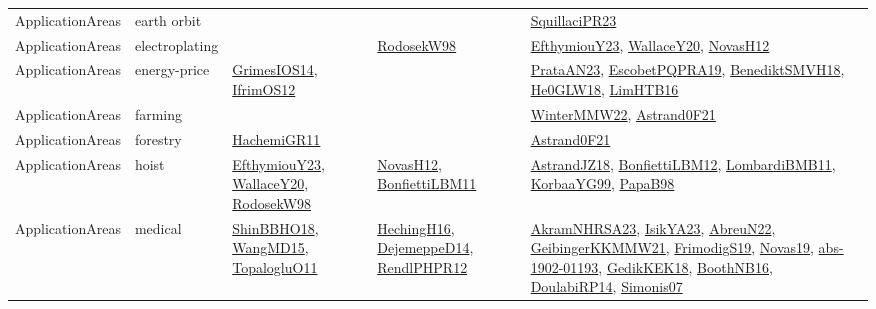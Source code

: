 {\begin{longtable}{lp{3cm}>{\raggedright}p{6cm}>{\raggedright}p{6cm}p{8cm}}
ApplicationAreas & earth orbit &  &  & \href{papers/SquillaciPR23.pdf}{SquillaciPR23}\cite{SquillaciPR23}\\
ApplicationAreas & electroplating &  & \href{papers/RodosekW98.pdf}{RodosekW98}\cite{RodosekW98} & \href{papers/EfthymiouY23.pdf}{EfthymiouY23}\cite{EfthymiouY23}, \href{articles/WallaceY20.pdf}{WallaceY20}\cite{WallaceY20}, \href{articles/NovasH12.pdf}{NovasH12}\cite{NovasH12}\\
ApplicationAreas & energy-price & \href{articles/GrimesIOS14.pdf}{GrimesIOS14}\cite{GrimesIOS14}, \href{papers/IfrimOS12.pdf}{IfrimOS12}\cite{IfrimOS12} &  & \href{articles/PrataAN23.pdf}{PrataAN23}\cite{PrataAN23}, \href{articles/EscobetPQPRA19.pdf}{EscobetPQPRA19}\cite{EscobetPQPRA19}, \href{papers/BenediktSMVH18.pdf}{BenediktSMVH18}\cite{BenediktSMVH18}, \href{papers/He0GLW18.pdf}{He0GLW18}\cite{He0GLW18}, \href{papers/LimHTB16.pdf}{LimHTB16}\cite{LimHTB16}\\
ApplicationAreas & farming &  &  & \href{papers/WinterMMW22.pdf}{WinterMMW22}\cite{WinterMMW22}, \href{papers/Astrand0F21.pdf}{Astrand0F21}\cite{Astrand0F21}\\
ApplicationAreas & forestry & \href{articles/HachemiGR11.pdf}{HachemiGR11}\cite{HachemiGR11} &  & \href{papers/Astrand0F21.pdf}{Astrand0F21}\cite{Astrand0F21}\\
ApplicationAreas & hoist & \href{papers/EfthymiouY23.pdf}{EfthymiouY23}\cite{EfthymiouY23}, \href{articles/WallaceY20.pdf}{WallaceY20}\cite{WallaceY20}, \href{papers/RodosekW98.pdf}{RodosekW98}\cite{RodosekW98} & \href{articles/NovasH12.pdf}{NovasH12}\cite{NovasH12}, \href{papers/BonfiettiLBM11.pdf}{BonfiettiLBM11}\cite{BonfiettiLBM11} & \href{papers/AstrandJZ18.pdf}{AstrandJZ18}\cite{AstrandJZ18}, \href{papers/BonfiettiLBM12.pdf}{BonfiettiLBM12}\cite{BonfiettiLBM12}, \href{papers/LombardiBMB11.pdf}{LombardiBMB11}\cite{LombardiBMB11}, \href{papers/KorbaaYG99.pdf}{KorbaaYG99}\cite{KorbaaYG99}, \href{articles/PapaB98.pdf}{PapaB98}\cite{PapaB98}\\
ApplicationAreas & medical & \href{articles/ShinBBHO18.pdf}{ShinBBHO18}\cite{ShinBBHO18}, \href{articles/WangMD15.pdf}{WangMD15}\cite{WangMD15}, \href{articles/TopalogluO11.pdf}{TopalogluO11}\cite{TopalogluO11} & \href{papers/HechingH16.pdf}{HechingH16}\cite{HechingH16}, \href{papers/DejemeppeD14.pdf}{DejemeppeD14}\cite{DejemeppeD14}, \href{papers/RendlPHPR12.pdf}{RendlPHPR12}\cite{RendlPHPR12} & \href{articles/AkramNHRSA23.pdf}{AkramNHRSA23}\cite{AkramNHRSA23}, \href{articles/IsikYA23.pdf}{IsikYA23}\cite{IsikYA23}, \href{articles/AbreuN22.pdf}{AbreuN22}\cite{AbreuN22}, \href{papers/GeibingerKKMMW21.pdf}{GeibingerKKMMW21}\cite{GeibingerKKMMW21}, \href{papers/FrimodigS19.pdf}{FrimodigS19}\cite{FrimodigS19}, \href{articles/Novas19.pdf}{Novas19}\cite{Novas19}, \href{articles/abs-1902-01193.pdf}{abs-1902-01193}\cite{abs-1902-01193}, \href{articles/GedikKEK18.pdf}{GedikKEK18}\cite{GedikKEK18}, \href{papers/BoothNB16.pdf}{BoothNB16}\cite{BoothNB16}, \href{papers/DoulabiRP14.pdf}{DoulabiRP14}\cite{DoulabiRP14}, \href{articles/Simonis07.pdf}{Simonis07}\cite{Simonis07}\\

\end{longtable}}
